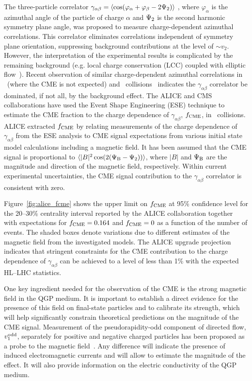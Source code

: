 The three-particle correlator $\gamma_{\alpha\beta} = \langle \cos(\varphi_{\alpha} + \varphi_{\beta} - 2\Psi_{\rm 2}) \rangle$ \cite{Voloshin:2004vk}, 
where $\varphi_{\alpha}$ is the azimuthal angle of the particle of charge $\alpha$ and $\Psi_{\rm 2}$ is the second harmonic symmetry plane 
angle, was proposed to measure charge-dependent azimuthal correlations. This correlator eliminates correlations independent of symmetry 
plane orientation, suppressing background contributions at the level of $\sim v_2$. However, the interpretation of the experimental results is 
complicated by the remaining background (e.g. local charge conservation (LCC) coupled with elliptic flow~\cite{Schlichting:2010qia, Pratt:2010zn}). 
Recent observation of similar charge-dependent azimuthal correlations in \ppb\ (where the CME is not expected) and 
\pbpb\ collisions~\cite{Khachatryan:2016got} indicates 
the $\gamma_{\alpha\beta}$ correlator be dominated, if not all, by the background effect.
The ALICE \cite{Acharya:2017fau} and CMS \cite{Sirunyan:2017quh} collaborations have used the Event Shape Engineering (ESE) technique 
\cite{Schukraft:2012ah} to estimate the CME fraction to the charge dependence of $\gamma_{\alpha\beta}$, $f_{\rm CME}$, in \pbpb\ collisions. 
ALICE extracted 
$f_{\rm CME}$ by relating measurements of the charge dependence of $\gamma_{\alpha\beta}$ from the ESE analysis to CME signal expectations from 
various initial state model calculations including a magnetic field. It has been assumed that the CME signal is proportional to 
$\langle |B|^2 \cos(2(\Psi_{\rm B} - \Psi_2)) \rangle$, where $|B|$ and $\Psi_{\rm B}$ are the magnitude and direction of the magnetic field, respectively. Within current experimental uncertainties, the CME signal contribution to the $\gamma_{\alpha\beta}$ correlator is consistent with zero.

Figure~\ref{fig:alice_fcme} shows the upper limit on $f_{\rm CME}$ at 95\% confidence level for the 20--30\% centrality interval reported by the 
ALICE collaboration together with expectations for $f_{\rm CME}=0.164$ and $f_{\rm CME}=0$ as a function of the number of events. The shaded 
boxes denote variations due to different estimates of the magnetic field from the investigated models. The ALICE upgrade projection indicates that 
stringent constraints for the CME contribution to the charge dependence of $\gamma_{\alpha\beta}$ can be achieved to a level of less than 1\% 
with the expected HL--LHC statistics. 

One key ingredient needed for the observation of the CME is the strong magnetic field in the QGP medium. It is important to establish a direct
evidence for the presence of this field on final-state particles and to calibrate its strength, which will help significantly constrain theoretical predictions on the magnitude of the CME signal. Measurement of the pseudorapidity-odd component of directed 
flow, $v_1^{\rm odd}$, separately for positive and negative charged particles has been proposed as a probe to 
the magnetic field~\cite{Gursoy:2014aka}. Any difference will indicate the presence of induced electromagnetic 
currents and will allow to estimate the magnitude of the effect. It will also provide information on the electric conductivity of the QGP medium.


